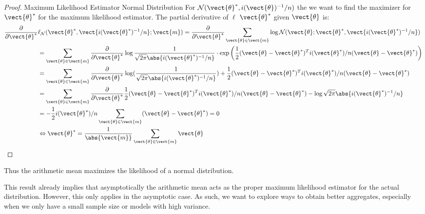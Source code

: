 \begin{proof}{Maximum Likelihood Estimator Normal Distribution}
    For $\mathcal{N}(\vect{\theta}^*, i(\vect{\theta})^{-1}/n)$ the we want to find the maximizer for $\vect{\theta}^*$ for the maximum likelihood estimator. 
    The partial derivative of $\ell$ \wrt $\vect{\theta}^*$ given $\vect{\theta}$ is:
    \begin{equation}
        \begin{split}
        \frac{\partial}{\partial \vect{\theta}^*}&\ell_{\mathcal{N}}(\vect{\theta}^*, \vect{i(\vect{\theta}^*)^{-1}/n}; \vect{m}) =  \frac{\partial}{\partial \vect{\theta}^*} \sum_{\vect{\theta} \in \vect{m}} \log \mathcal{N}(\vect{\theta}; \vect{\theta}^*, \vect{i(\vect{\theta}^*)^{-1}/n})\\
        &=  \sum_{\vect{\theta} \in \vect{m}} \frac{\partial}{\partial \vect{\theta}^*} \log \frac{1}{\sqrt{2 \pi} \abs{i(\vect{\theta}^*)^{-1}/n}} \cdot \exp\bigg(\frac{1}{2} (\vect{\theta} - \vect{\theta}^*)^Ti(\vect{\theta}^*)/n(\vect{\theta} - \vect{\theta}^*) \bigg) \\
        &=  \sum_{\vect{\theta} \in \vect{m}} \frac{\partial}{\partial \vect{\theta}^*} \log (\frac{1}{\sqrt{2 \pi} \abs{i(\vect{\theta}^*)^{-1}/n}}) + \frac{1}{2} (\vect{\theta} - \vect{\theta}^*)^Ti(\vect{\theta}^*)/n(\vect{\theta} - \vect{\theta}^*) \\
        &=  \sum_{\vect{\theta} \in \vect{m}} \frac{\partial}{\partial \vect{\theta}^*} \frac{1}{2} (\vect{\theta} - \vect{\theta}^*)^Ti(\vect{\theta}^*)/n(\vect{\theta} - \vect{\theta}^*) - \log \sqrt{2 \pi} \abs{i(\vect{\theta}^*)^{-1}/n} \\
        &= - \frac{1}{2} i(\vect{\theta}^*)/n \sum_{\vect{\theta} \in \vect{m}} (\vect{\theta} - \vect{\theta}^*) = 0 \\
        &\Leftrightarrow \vect{\theta}^* = \frac{1}{\abs{\vect{m}}} \sum_{\vect{\theta} \in \vect{m}}  \vect{\theta}
        \end{split}
    \end{equation}
\end{proof}
Thus the arithmetic mean maximizes the likelihood of a normal distribution.

This result already implies that asymptotically the arithmetic mean acts as the proper maximum likelihood estimator for the actual distribution. 
However, this only applies in the asymptotic case. 
As such, we want to explore ways to obtain better aggregates, especially when we only have a small sample size or models with high variance.

